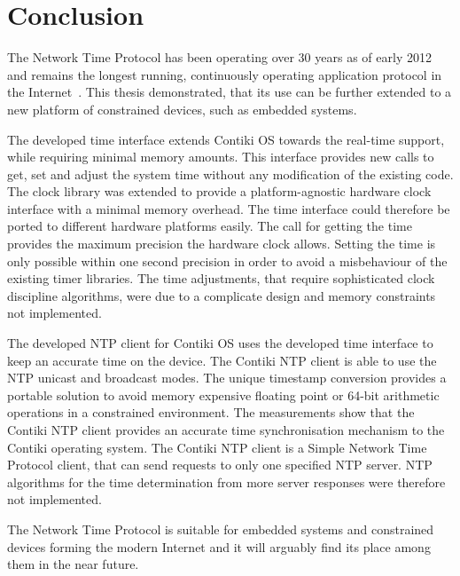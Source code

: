 






\chapter{Conclusion}
The Network Time Protocol has been operating over 30 years as of early 2012
and remains the longest running, continuously operating application
protocol in the Internet~\cite{ntp-y2k}.
This thesis demonstrated, that its use can be further extended to a new platform of constrained devices,
such as embedded systems.

The developed time interface extends Contiki OS towards the real-time support,
while requiring minimal memory amounts.
This interface provides new calls to get, set and adjust the system time without any modification
of the existing code.
The clock library was extended to provide a platform-agnostic hardware clock interface
with a minimal memory overhead.
The time interface could therefore be ported to different hardware platforms easily.
The call for getting the time provides the maximum precision the hardware clock allows.
Setting the time is only possible within one second precision in order to avoid
a misbehaviour of the existing timer libraries.
The time adjustments, that require sophisticated clock discipline algorithms,
were due to a complicate design and memory constraints not implemented.

The developed NTP client for Contiki OS uses the developed time interface to keep an accurate time on the device.
The Contiki NTP client is able to use the NTP unicast and broadcast modes.
The unique timestamp conversion provides a portable solution to avoid
memory expensive floating point or 64-bit arithmetic operations in a constrained environment.
The measurements show that the Contiki NTP client provides an accurate time
synchronisation mechanism to the Contiki operating system.
The Contiki NTP client is a Simple Network Time Protocol client,
that can send requests to only one specified NTP server.
NTP algorithms for the time determination from more server responses were therefore not implemented.

The Network Time Protocol is suitable for embedded systems and constrained devices
forming the modern Internet and it will arguably find its place among them in the near future.






